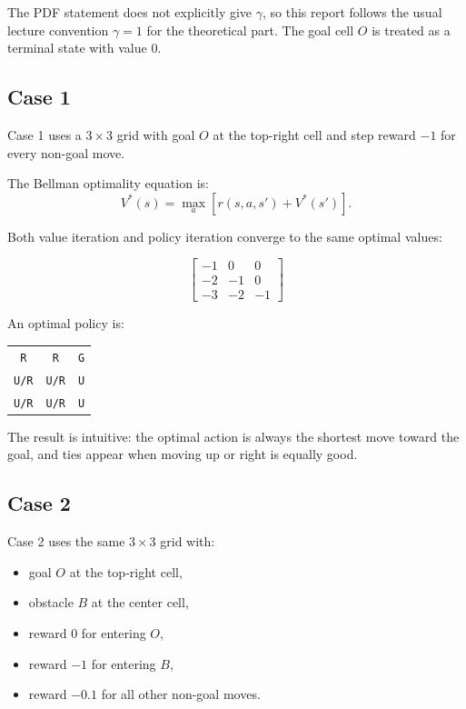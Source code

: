 \documentclass[11pt,a4paper]{article}
\begin{document}
The PDF statement does not explicitly give $\gamma$, so this report follows the usual lecture convention $\gamma = 1$ for the theoretical part. The goal cell $O$ is treated as a terminal state with value $0$.

\subsection{Case 1}

Case 1 uses a $3 \times 3$ grid with goal $O$ at the top-right cell and step reward $-1$ for every non-goal move.

The Bellman optimality equation is:
\[
V^*(s) = \max_a \left[ r(s,a,s') + V^*(s') \right].
\]

Both value iteration and policy iteration converge to the same optimal values:

\[
\begin{bmatrix}
-1 & 0 & 0 \\
-2 & -1 & 0 \\
-3 & -2 & -1
\end{bmatrix}
\]

An optimal policy is:

\begin{center}
\begin{tabular}{ccc}
\texttt{R} & \texttt{R} & \texttt{G} \\
\texttt{U/R} & \texttt{U/R} & \texttt{U} \\
\texttt{U/R} & \texttt{U/R} & \texttt{U}
\end{tabular}
\end{center}

The result is intuitive: the optimal action is always the shortest move toward the goal, and ties appear when moving up or right is equally good.

\subsection{Case 2}

Case 2 uses the same $3 \times 3$ grid with:

\begin{itemize}
    \item goal $O$ at the top-right cell,
    \item obstacle $B$ at the center cell,
    \item reward $0$ for entering $O$,
    \item reward $-1$ for entering $B$,
    \item reward $-0.1$ for all other non-goal moves.
\end{itemize}
\end{document}
